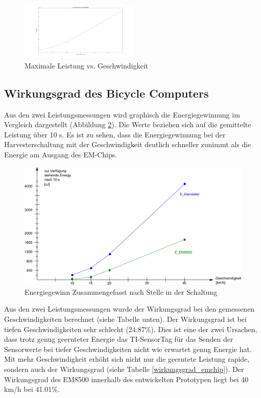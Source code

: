 \begin{figure}[ht]
    \includegraphics[width=0.5\textwidth]{4Resultate/imag/ResultatLeistungGeschwindigkeit.png} 
    \caption{Maximale Leistung vs. Geschwindigkeit}
    \label{energie_resultat_harvester}
\end{figure}

\subsection{Wirkungsgrad des Bicycle Computers}

Aus den zwei Leistungsmessungen wird graphisch die Energiegewinnung im Vergleich dargestellt (Abbildung \ref{zsmEnergyGewinn}). Die Werte beziehen sich auf die gemittelte Leistung über 10 s. Es ist zu sehen, dass die Energiegewinnung bei der Harvesterschaltung mit der Geschwindigkeit deutlich schneller zunimmt als die Energie am Ausgang des EM-Chips. 

\begin{figure}[ht]
    \includegraphics[width=1\textwidth]{4Resultate/imag/EnergyGewinnNachStelle.png} 
    \caption{Energiegewinn Zusammengefasst nach Stelle in der Schaltung}
    \label{zsmEnergyGewinn}
\end{figure}

Aus den zwei Leistungsmessungen wurde der Wirkungsgrad bei den gemessenen Geschwindigkeiten berechnet (siehe Tabelle unten). Der Wirkungsgrad ist bei tiefen Geschwindigkeiten sehr schlecht (24.87\thinspace\%). Dies ist eine der zwei Ursachen, dass trotz genug geernteter Energie das TI-SensorTag für das Senden der Sensorwerte bei tiefer Geschwindigkeiten nicht wie erwartet genug Energie hat. Mit mehr Geschwindigkeit erhöht sich nicht nur die geerntete Leistung rapide, sondern auch der Wirkungsgrad (siehe Tabelle \ref{wirkungsgrad_emchip}). Der Wirkungsgrad des EM8500 innerhalb des entwickelten Prototypen liegt bei 40 km/h  bei 41.01\thinspace\%.  

